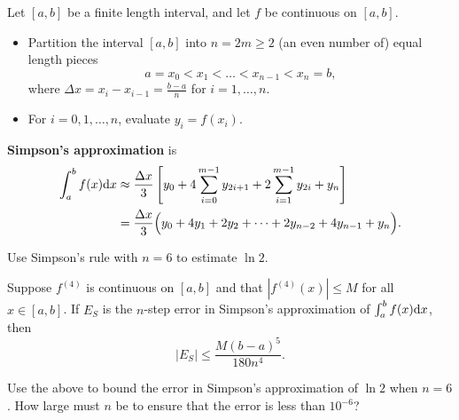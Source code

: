 \begin{definition}
Let $[a,b]$ be a finite length interval, and let $f$ be continuous on $[a,b]$.
\begin{itemize}
\item Partition the interval $[a,b]$ into $n=2m \ge 2$ (an even number of) equal length pieces
\begin{equation*}
a=x_0 < x_1 <\dots < x_{n-1} < x_n = b,
\end{equation*}
where $\Delta x = x_i - x_{i-1} = \frac{b-a}{n}$ for $i=1,\dots, n$.
\item For $i=0,1,\dots, n$, evaluate $y_i = f(x_i)$.
\end{itemize}
\textbf{Simpson's approximation} is
\begin{equation*}
\begin{split}
\int_a^bf(x)\mathrm{d} x &\approx \frac{\Delta x}{3}\left[y_0 + 4\sum_{i=0}^{m-1} y_{2i+1} + 2\sum_{i=1}^{m-1} y_{2i} + y_n\right]\\
&= \frac{\Delta x}{3}\Big(y_0 + 4y_1 + 2y_2 + \dots + 2y_{n-2} + 4y_{n-1} + y_n\Big).
\end{split}
\end{equation*}
\end{definition}

\newpage

\begin{example}
Use Simpson's rule with $n=6$ to estimate $\ln 2$.
\end{example}

\newpage

\begin{theorem}
Suppose $f^{(4)}$ is continuous on $[a,b]$ and that $|f^{(4)}(x)|\le M$ for all $x\in [a,b]$.
If $E_S$ is the $n$-step error in Simpson's approximation of $\int_a^bf(x)\mathrm{d} x$, then
\begin{equation*}
|E_S| \le \frac{M(b-a)^5}{180n^4}.
\end{equation*}
\end{theorem}



\begin{example}
Use the above to bound the error in Simpson's approximation of $\ln 2$ when $n=6$.
How large must $n$ be to ensure that the error is less than $10^{-6}$?
\end{example}
